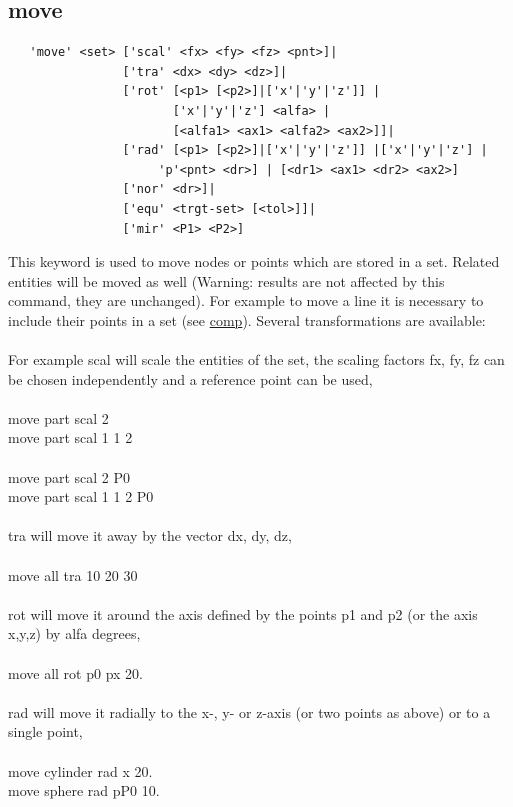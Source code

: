 \documentclass{article}
\providecommand{\htmlref}[2]{\hyperref[#2]{#1}}
\begin{document}
\subsection{\label{move}move}
\begin{verbatim}
   'move' <set> ['scal' <fx> <fy> <fz> <pnt>]|
                ['tra' <dx> <dy> <dz>]|
                ['rot' [<p1> [<p2>]|['x'|'y'|'z']] |
                       ['x'|'y'|'z'] <alfa> |
                       [<alfa1> <ax1> <alfa2> <ax2>]]|
                ['rad' [<p1> [<p2>]|['x'|'y'|'z']] |['x'|'y'|'z'] |
                     'p'<pnt> <dr>] | [<dr1> <ax1> <dr2> <ax2>]
                ['nor' <dr>]|
                ['equ' <trgt-set> [<tol>]]|
                ['mir' <P1> <P2>]
\end{verbatim}
This keyword is used to move nodes or points which are stored in a set. Related entities will be moved as well (Warning: results are not affected by this command, they are unchanged). For example to move a line it is necessary to include their points in a set (see \htmlref{comp}{comp}). Several transformations are available:\\\\For example scal will scale the entities of the set, the scaling factors fx, fy, fz can be chosen independently and a reference point can be used,\\\\
move part scal 2 \\
move part scal 1 1 2\\\\
move part scal 2 P0\\
move part scal 1 1 2 P0\\\\
tra will move it away by the vector dx, dy, dz,\\\\
move all tra 10 20 30 \\\\
rot will move it around the axis defined by the points p1 and p2 (or the axis x,y,z) by alfa degrees,\\\\
move all rot p0 px 20.\\\\
rad will move it radially to the x-, y- or z-axis (or two points as above) or to a single point,\\\\
move cylinder rad x 20.\\
move sphere rad pP0 10.\\\\
\end{document}
